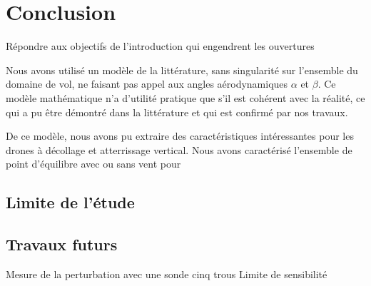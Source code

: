 \chapter*{Conclusion}
{ \color{red}
Répondre aux objectifs de l'introduction qui engendrent les ouvertures



Nous avons utilisé un modèle de la littérature, sans singularité sur l'ensemble du domaine de vol, ne faisant pas appel aux angles aérodynamiques $\alpha$ et $\beta$. Ce modèle mathématique n'a d'utilité pratique que s'il est cohérent avec la réalité, ce qui a pu être démontré dans la littérature et qui est confirmé par nos travaux.

De ce modèle, nous avons pu extraire des caractéristiques intéressantes pour les drones à décollage et atterrissage vertical. 
Nous avons caractérisé l'ensemble de point d'équilibre avec ou sans vent pour 

\section{Limite de l'étude}

\section{Travaux futurs}

Mesure de la perturbation avec une sonde cinq trous
Limite de sensibilité

}